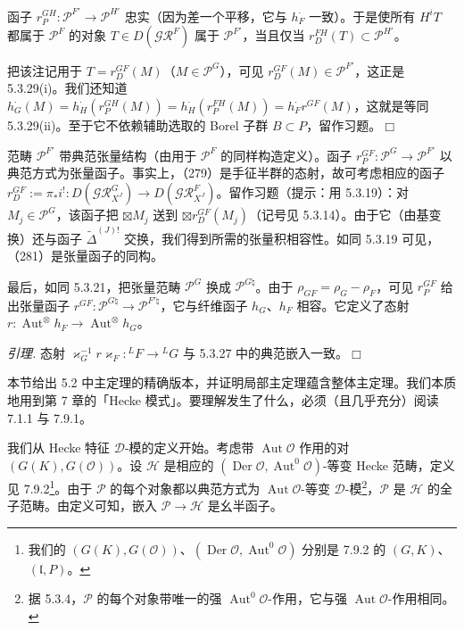 函子 $r_P^{GH}:\mathcal{P}^{F'}\to\mathcal{P}^{H'}$ 忠实（因为差一个平移，它与 $h_F^{\cdot}$ 一致）。于是使所有 $H^iT$ 都属于 $\mathcal{P}^F$ 的对象 $T\in D(\mathcal{GR}^F)$ 属于 $\mathcal{P}^{F'}$，当且仅当 $r_D^{FH}(T)\subset\mathcal{P}^{H'}$。

把该注记用于 $T=r_D^{GF}(M)$（$M\in\mathcal{P}^G$），可见 $r_D^{GF}(M)\in\mathcal{P}^{F'}$，这正是 5.3.29(i)。我们还知道 $h_G^{\cdot}(M)=h_H^{\cdot}(r_P^{GH}(M))=h_H^{\cdot}(r_P^{FH}(M))=h_F^{\cdot}r^{GF}(M)$，这就是等同 5.3.29(ii)。至于它不依赖辅助选取的 Borel 子群 $B\subset P$，留作习题。\hfill$\Box$

 范畴 $\mathcal{P}^{F'}$ 带典范张量结构（由用于 $\mathcal{P}^F$ 的同样构造定义）。函子 $r_P^{GF}:\mathcal{P}^G\to\mathcal{P}^{F'}$ 以典范方式为张量函子。事实上，（279）是手征半群的态射，故可考虑相应的函子 $r_D^{GF}:=\pi_*i^{!}:D(\mathcal{GR}^G_{X^J})\to D(\mathcal{GR}^F_{X^J})$。留作习题（提示：用 5.3.19）：对 $M_j\in\mathcal{P}^G$，该函子把 $\boxtimes M_j$ 送到 $\boxtimes r_D^{GF}(M_j)$（记号见 5.3.14）。由于它（由基变换）还与函子 $\widetilde{\Delta}^{(J)!}$ 交换，我们得到所需的张量积相容性。如同 5.3.19 可见，（281）是张量函子的同构。

最后，如同 5.3.21，把张量范畴 $\mathcal{P}^G$ 换成 $\mathcal{P}^{G\natural}$。由于 $\rho_{GF}=\rho_G-\rho_F$，可见 $r_P^{GF}$ 给出张量函子 $r^{GF}:\mathcal{P}^{G\natural}\to\mathcal{P}^{F'\natural}$，它与纤维函子 $h_G$、$h_F$ 相容。它定义了态射 $r:\operatorname{Aut}^{\otimes}h_F\to\operatorname{Aut}^{\otimes}h_G$。

 \emph{引理.} 态射 $\varkappa_G^{-1}r\varkappa_F:{}^{L}F\to{}^{L}G$ 与 5.3.27 中的典范嵌入一致。\hfill$\Box$


本节给出 5.2 中主定理的精确版本，并证明局部主定理蕴含整体主定理。我们本质地用到第 7 章的「Hecke 模式」。要理解发生了什么，必须（且几乎充分）阅读 7.1.1 与 7.9.1。


 我们从 Hecke 特征 $\mathcal{D}$-模的定义开始。考虑带 $\operatorname{Aut}\mathcal{O}$ 作用的对 $(G(K),G(\mathcal{O}))$。设 $\mathcal{H}$ 是相应的 $(\operatorname{Der}\mathcal{O},\operatorname{Aut}^0\mathcal{O})$-等变 Hecke 范畴，定义见 7.9.2\footnote{我们的 $(G(K),G(\mathcal{O}))$、$(\operatorname{Der}\mathcal{O},\operatorname{Aut}^0\mathcal{O})$ 分别是 7.9.2 的 $(G,K)$、$(\mathfrak{l},P)$。}。由于 $\mathcal{P}$ 的每个对象都以典范方式为 $\operatorname{Aut}\mathcal{O}$-等变 $\mathcal{D}$-模\footnote{据 5.3.4，$\mathcal{P}$ 的每个对象带唯一的强 $\operatorname{Aut}^0\mathcal{O}$-作用，它与强 $\operatorname{Aut}\mathcal{O}$-作用相同。}，$\mathcal{P}$ 是 $\mathcal{H}$ 的全子范畴。由定义可知，嵌入 $\mathcal{P}\to\mathcal{H}$ 是幺半函子。

